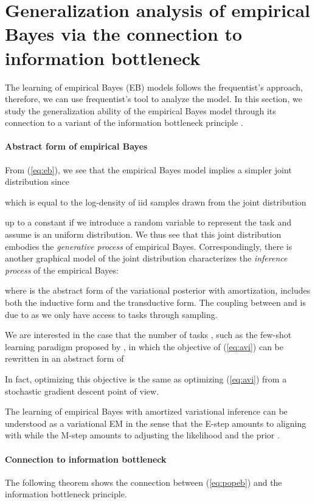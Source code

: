 \documentclass{article} \usepackage{iclr2020_conference,times}
\def\eqref#1{(\ref{#1})}
\begin{document}
 \section{Generalization analysis of empirical Bayes via the connection to information bottleneck}
\label{sec:theory}

The learning of empirical Bayes (EB) models follows the frequentist's approach,
therefore, we can use frequentist's tool to analyze the model.
In this section, we study the generalization ability of the empirical Bayes model
through its connection to a variant of the information bottleneck principle \citet{Achille17,tishby2000information}. 

\paragraph{Abstract form of empirical Bayes}
From \eqref{eq:eb}, we see that the empirical Bayes model implies a simpler joint distribution since

which is equal to the log-density of  iid samples drawn from the joint distribution

up to a constant if we introduce a random variable to represent the task and assume  is an uniform distribution.
We thus see that this joint distribution embodies the \emph{generative process} of empirical Bayes. 
Correspondingly, there is another graphical model of the joint distribution characterizes
the \emph{inference process} of the empirical Bayes:

where  is the abstract form of the variational posterior with amortization,
includes both the inductive form and the transductive form.
The coupling between  and  is due to  as we only have access to tasks through sampling.

We are interested in the case that the number of tasks ,
such as the few-shot learning paradigm proposed by \citet{vinyals2016matching},
in which the objective of \eqref{eq:avi} can be rewritten in an abstract form of

In fact, optimizing this objective is the same as optimizing \eqref{eq:avi} from
a stochastic gradient descent point of view.

The learning of empirical Bayes with amortized variational inference 
can be understood as a variational EM in the sense that
the E-step amounts to aligning  with  while the M-step amounts to adjusting the likelihood  and the prior .



\paragraph{Connection to information bottleneck}
The following theorem shows the connection between \eqref{eq:popeb} and the information bottleneck principle.
\end{document}
